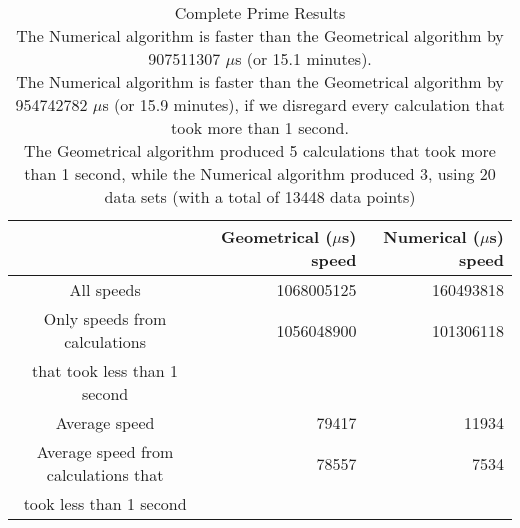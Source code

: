 \begin{table}[bth!]\footnotesize
 \begin{tabular}[3]{c|r|r}
 & Geometrical ($\mu$s) speed & Numerical ($\mu$s) speed\\
\hline
All speeds & 1068005125 & 160493818 \\ 
\hline 
Only speeds from calculations & 1056048900 & 101306118 \\ 
that took less than 1 second & & \\ 
\hline
Average speed & 79417 & 11934 \\
\hline
Average speed from calculations that & 78557 & 7534 \\ 
took less than 1 second & & \\ 
\end{tabular}\\ \\
\caption{Complete Prime Results\\
The Numerical algorithm is faster than the Geometrical algorithm by 907511307 $\mu$s (or 15.1 minutes).\\
The Numerical algorithm is faster than the Geometrical algorithm by 954742782 $\mu$s (or 15.9 minutes), if we disregard every calculation that took more than 1 second.\\
The Geometrical algorithm produced 5 calculations that took more than 1 second, while the Numerical algorithm produced 3, using 20 data sets (with a total of 13448 data points)\\
}\label{prime_speedtable}\end{table}